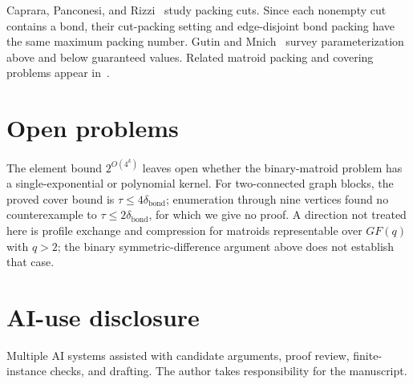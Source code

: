 \documentclass[11pt]{article}
\newcommand{\bond}{\operatorname{bond}}
\begin{document}
Caprara, Panconesi, and Rizzi~\citep{Caprara2004} study packing
cuts.  Since each nonempty cut contains a bond, their cut-packing
setting and edge-disjoint bond packing have the same maximum packing
number.  Gutin and Mnich~\citep{GutinMnich2022} survey parameterization
above and below guaranteed values.  Related matroid packing and
covering problems appear in~\citep{BernathKiraly2014,Oxley1978,Seymour1980}.

\section{Open problems}
\sloppy
The element bound $2^{O(4^k)}$ leaves open whether the binary-matroid
problem has a single-exponential or polynomial kernel.  For
two-connected graph blocks, the proved cover bound is
$\tau\leq4\delta_{\bond}$; enumeration through nine vertices found
no counterexample to $\tau\leq2\delta_{\bond}$, for which we give no
proof.  A direction not treated here is profile exchange and
compression for matroids representable over $GF(q)$ with $q>2$; the binary
symmetric-difference argument above does not establish that case.

\section*{AI-use disclosure}
Multiple AI systems assisted with candidate arguments, proof review,
finite-instance checks, and drafting.  The author takes responsibility
for the manuscript.



\end{document}
